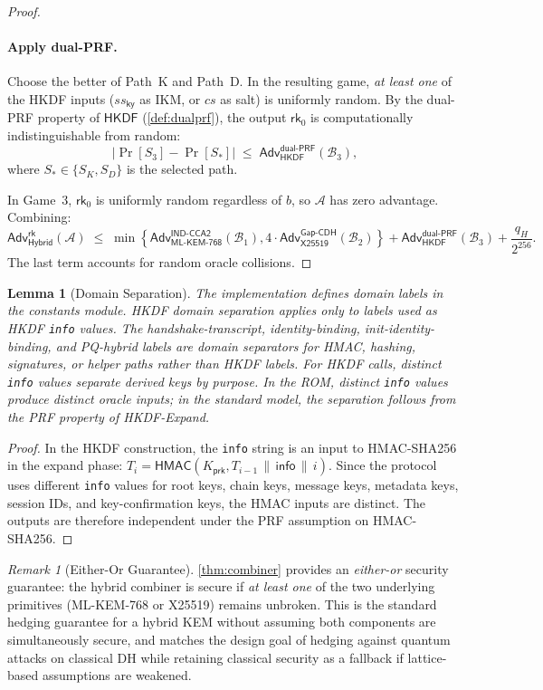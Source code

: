\documentclass[11pt,a4paper]{article}
\newtheorem{lemma}[theorem]{Lemma}
\theoremstyle{definition}
\theoremstyle{remark}
\newtheorem{remark}[theorem]{Remark}
\newcommand{\adv}{\mathsf{Adv}}
\newcommand{\advA}{\mathcal{A}}
\newcommand{\advB}{\mathcal{B}}
\newcommand{\HKDF}{\mathsf{HKDF}}
\newcommand{\HMAC}{\mathsf{HMAC}}
\renewcommand{\DH}{\mathsf{X25519}}
\newcommand{\KEM}{\mathsf{ML\text{-}KEM\text{-}768}}
\newcommand{\GapCDH}{\mathsf{Gap\text{-}CDH}}
\newcommand{\INDCCA}{\mathsf{IND\text{-}CCA2}}
\newcommand{\dualPRF}{\mathsf{dual\text{-}PRF}}
\newcommand{\rk}{\mathsf{rk}}
\newcommand{\concat}{\,\|\,}
\begin{document}
\begin{proof}
\paragraph{Apply dual-PRF.}
Choose the better of Path~K and Path~D.  In the resulting game,
\emph{at least one} of the HKDF inputs ($\mathit{ss}_{\mathsf{ky}}$ as IKM,
or $\mathit{cs}$ as salt) is uniformly random.  By the dual-PRF property of
$\HKDF$ (\cref{def:dualprf}), the output $\rk_0$ is computationally
indistinguishable from random:
\[
  |\Pr[S_3] - \Pr[S_*]| \;\leq\; \adv^{\dualPRF}_{\HKDF}(\advB_3),
\]
where $S_* \in \{S_K,S_D\}$ is the selected path.

In Game~3, $\rk_0$ is uniformly random regardless of $b$, so
$\advA$ has zero advantage.  Combining:
\[
  \adv^{\mathsf{rk}}_{\mathsf{Hybrid}}(\advA)
  \;\leq\; \min\!\left\{\adv^{\INDCCA}_{\KEM}(\advB_1),
  4 \cdot \adv^{\GapCDH}_{\DH}(\advB_2)\right\}
  + \adv^{\dualPRF}_{\HKDF}(\advB_3) + \frac{q_H}{2^{256}}.
\]
The last term accounts for random oracle collisions. \qedhere
\end{proof}

\begin{lemma}[Domain Separation]
\label{lem:domain-sep}
The implementation defines domain labels in the constants module.
HKDF domain separation applies only to labels used as HKDF \texttt{info}
values. The handshake-transcript, identity-binding, init-identity-binding, and
PQ-hybrid labels are domain separators for HMAC, hashing, signatures, or helper
paths rather than HKDF labels. For HKDF calls, distinct
\texttt{info} values separate derived keys by purpose. In the ROM, distinct
\texttt{info} values produce distinct oracle inputs; in the standard model, the
separation follows from the PRF property of HKDF-Expand.
\end{lemma}

\begin{proof}
In the HKDF construction, the \texttt{info} string is an input to HMAC-SHA256 in
the expand phase: $T_i = \HMAC(K_{\mathsf{prk}}, T_{i-1}\concat
\mathsf{info}\concat i)$. Since the protocol uses different \texttt{info}
values for root keys, chain keys, message keys, metadata keys, session IDs, and
key-confirmation keys, the HMAC inputs are distinct. The outputs are therefore
independent under the PRF assumption on HMAC-SHA256. \qedhere
\end{proof}

\begin{remark}[Either-Or Guarantee]
\cref{thm:combiner} provides an \emph{either-or} security guarantee: the
hybrid combiner is secure if \emph{at least one} of the two underlying
primitives (ML-KEM-768 or X25519) remains unbroken.  This is the standard
hedging guarantee for a hybrid KEM without assuming both components are
simultaneously secure, and matches the design goal of hedging against quantum
attacks on classical DH while retaining classical security as a fallback if
lattice-based assumptions are weakened.
\end{remark}
\end{document}
